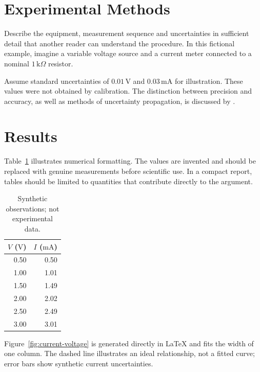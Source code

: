 \documentclass[10pt,a4paper]{article}
\begin{document}
\section{Experimental Methods}
\label{sec:methods}
Describe the equipment, measurement sequence and uncertainties in sufficient
detail that another reader can understand the procedure. In this fictional
example, imagine a variable voltage source and a current meter connected to
a nominal \(1\,\mathrm{k}\Omega\) resistor.

Assume standard uncertainties of \(0.01\,\mathrm{V}\) and
\(0.03\,\mathrm{mA}\) for illustration. These values were not obtained by
calibration. The distinction between precision and accuracy, as well as
methods of uncertainty propagation, is discussed by \citet{taylor1997}.

\section{Results}
\label{sec:results}
Table~\ref{tab:data} illustrates numerical formatting. The values are
invented and should be replaced with genuine measurements before scientific
use. In a compact report, tables should be limited to quantities that
contribute directly to the argument.

\begin{table}[htbp]
    \centering
    \caption{Synthetic observations; not experimental data.}
    \label{tab:data}
    \begin{tabular}{@{}rr@{}}
        \toprule
        \(V\) (\(\mathrm{V}\)) & \(I\) (\(\mathrm{mA}\)) \\
        \midrule
        0.50 & 0.50 \\
        1.00 & 1.01 \\
        1.50 & 1.49 \\
        2.00 & 2.02 \\
        2.50 & 2.49 \\
        3.00 & 3.01 \\
        \bottomrule
    \end{tabular}
\end{table}

Figure~\ref{fig:current-voltage} is generated directly in LaTeX and fits
the width of one column. The dashed line illustrates an ideal relationship,
not a fitted curve; error bars show synthetic current uncertainties.
\end{document}
